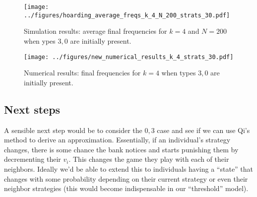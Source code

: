\documentclass[13pt]{amsart}
\begin{document}
\begin{figure}
    \texttt{[image: ../figures/hoarding\_average\_freqs\_k\_4\_N\_200\_strats\_30.pdf]}
    \caption{Simulation results: average final frequencies for $k = 4$ and $N = 200$ when ypes $3, 0$ are initially present.}
\end{figure}

\begin{figure}
    \texttt{[image: ../figures/new\_numerical\_results\_k\_4\_strats\_30.pdf]}
    \caption{Numerical results: final frequencies for $k = 4$ when types $3, 0$ are initially present.}
\end{figure}

\clearpage

\subsection*{Next steps}

A sensible next step would be to consider the $0, 3$ case and see if we can use Qi's method to derive an approximation.
Essentially, if an individual's strategy changes, there is some chance the bank notices and starts punishing them by decrementing their $v_i$.
This changes the game they play with each of their neighbors.
Ideally we'd be able to extend this to individuals having a ``state'' that changes with some probability depending on their current strategy or even their neighbor strategies (this would become indispensable in our ``threshold'' model).
\end{document}
